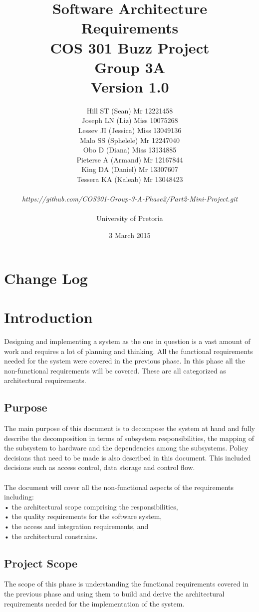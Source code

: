 \documentclass[a4paper]{article}
\title{Software Architecture Requirements 
\\COS 301 Buzz Project
\\Group 3A
\\Version 1.0}
\author{Hill ST (Sean) Mr 12221458 
\\Joseph LN (Liz) Miss 10075268 
\\Lessev JI (Jessica) Miss 13049136
\\Malo SS (Sphelele) Mr 12247040 
\\Obo D (Diana) Miss 13134885 
\\Pieterse A (Armand) Mr 12167844
\\King DA (Daniel) Mr 13307607
\\Tessera KA (Kaleab) Mr 13048423
\\
\\\textit{https://github.com/COS301-Group-3-A-Phase2/Part2-Mini-Project.git}
\\
\\ University of Pretoria}
\date{3 March 2015}
\begin{document}
\maketitle
\newpage


\tableofcontents
\newpage

\section{Change Log}

\section{Introduction}
Designing and implementing a system as the one in question is a vast amount of work and requires a lot of planning and thinking. All the functional requirements needed for the system were covered in the previous phase. In this phase all the non-functional requirements will be covered. These are all categorized as architectural requirements.  \\
\subsection{Purpose}
The main purpose of this document is to decompose the system at hand and fully describe the decomposition in terms of subsystem responsibilities, the mapping of the subsystem to hardware and the dependencies among the subsystems. Policy decisions that need to be made is also described in this document. This included decisions such as access control, data storage and control flow.\\\\
The document will cover all the non-functional aspects of the requirements including:\\
•	the architectural scope comprising the responsibilities,\\
•	the quality requirements for the software system,\\
•	the access and integration requirements, and\\
•	the architectural constrains. \\

\subsection{Project Scope}
The scope of this phase is understanding the functional requirements covered in the previous phase and using them to build and derive the architectural requirements needed for the implementation of the system.\\
\end{document}
